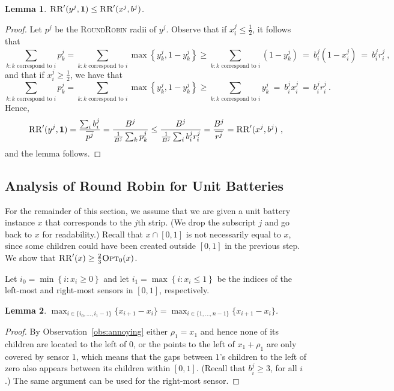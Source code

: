\documentclass[11pt]{article}
\newtheorem{lemma}{Lemma}
\newcommand{\set}[1]{\left\{ #1 \right\}}
\newcommand{\half}{\frac{1}{2}}
\newcommand{\rr}{\textsc{RoundRobin}\xspace}
\newcommand{\RR}{\textsc{RR}\xspace}
\newcommand{\opt}{\textsc{Opt}\xspace}
\begin{document}
\begin{lemma}
\label{lemma:unit-convex}
$\RR'(y^j,\mathbf{1}) \leq \RR'(x^j,b^j)$.
\end{lemma}
\begin{proof}
Let $p^j$ be the \rr radii of $y^j$.
Observe that if $x^j_i \leq \half$, it follows that
\[
\sum_{k:k \text{ correspond to } i} \!\!\!\!\!\! p^j_k 
=    \sum_{k:k \text{ correspond to } i} \!\!\!\!\!\! \max\set{y^j_k,1-y^j_k}
\geq \sum_{k:k \text{ correspond to } i} \!\!\!\!\!\! (1-y^j_k)
~=~  b^j_i (1-x^j_i)
~=~  b^j_i r^j_i
~,
\]
and that if $x^j_i \geq \half$, we have that
\[
\sum_{k:k \text{ correspond to } i} \!\!\!\!\!\! p^j_k 
=    \sum_{k:k \text{ correspond to } i} \!\!\!\!\!\! \max\set{y^j_k,1-y^j_k}
\geq \sum_{k:k \text{ correspond to } i} \!\!\!\!\!\! y^j_k
~=~  b^j_i x^j_i
~=~  b^j_i r^j_i
~.
\]
Hence, 
\[
\RR'(y^j, \mathbf{1})
=    \frac{\sum_i b^j_i}{\overline{p^j}}
=    \frac{B^j}{\frac{1}{B^j} \sum_{k} p_k^j}
\leq \frac{B^j}{\frac{1}{B^j} \sum_{i} b^j_i r^j_i}
=    \frac{B^j}{\overline{r^j}}
=    \RR'(x^j, b^j) 
~,
\]
and the lemma follows.
\end{proof}




\subsection{Analysis of Round Robin for Unit Batteries}

For the remainder of this section, we assume that we are given a unit
battery instance $x$ that corresponds to the $j$th strip.  (We drop
the subscript $j$ and go back to $x$ for readability.)  Recall that $x
\cap [0,1]$ is not necessarily equal to $x$, since some children 
could have been created outside $[0,1]$ in the previous step.  We show
that $\RR'(x) \geq \frac{2}{3} \opt_0(x)$.

Let $i_0 = \min \set{i : x_i \geq 0}$ and let $i_1 = \max \set{i : x_i
\leq 1}$ be the indices of the left-most and right-most sensors in
$[0,1]$, respectively.  

\begin{lemma}
\label{lemma:Delta}
$\max_{i \in \{i_0,\ldots,i_1-1\}} \{x_{i+1}-x_i\}
= \max_{i \in \{1,\ldots,n-1\}} \{x_{i+1}-x_i\}$.
\end{lemma}
\begin{proof}
By Observation~\ref{obs:annoying} either $\rho_1 = x_1$ and hence none
of its children are located to the left of $0$, or the points to the
left of $x_1+\rho_1$ are only covered by sensor $1$, which means that
the gaps between $1$'s children to the left of zero also appears
between its children within $[0,1]$.  (Recall that $b^j_i \geq 3$, for
all $i$.)  The same argument can be used for the right-most sensor.
\end{proof}
\end{document}
